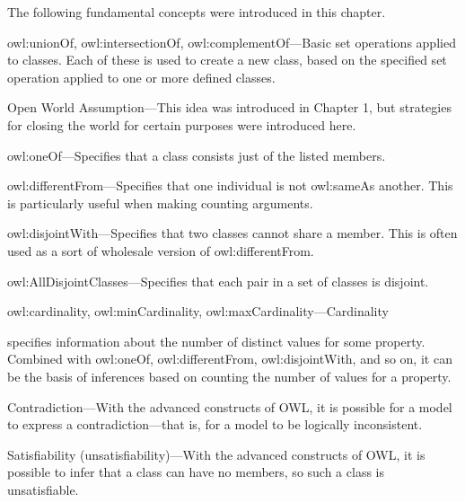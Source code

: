 The following fundamental concepts were introduced in this chapter.

owl:unionOf, owl:intersectionOf, owl:complementOf---Basic set operations
applied to classes. Each of these is used to create a new class, based
on the specified set operation applied to one or more defined classes.

Open World Assumption---This idea was introduced in Chapter 1, but
strategies for closing the world for certain purposes were introduced
here.

owl:oneOf---Specifies that a class consists just of the listed members.

owl:differentFrom---Specifies that one individual is not owl:sameAs
another. This is particularly useful when making counting arguments.

owl:disjointWith---Specifies that two classes cannot share a member.
This is often used as a sort of wholesale version of owl:differentFrom.

owl:AllDisjointClasses---Specifies that each pair in a set of classes is disjoint. 

owl:cardinality, owl:minCardinality, owl:maxCardinality---Cardinality

specifies information about the number of distinct values for some
property. Combined with owl:oneOf, owl:differentFrom, owl:disjointWith,
and so on, it can be the basis of inferences based on counting the
number of values for a property.

Contradiction---With the advanced constructs of OWL, it is possible for
a model to express a contradiction---that is, for a model to be
logically inconsistent.

Satisfiability (unsatisfiability)---With the advanced constructs of OWL,
it is possible to infer that a class can have no members, so such a
class is unsatisfiable.
